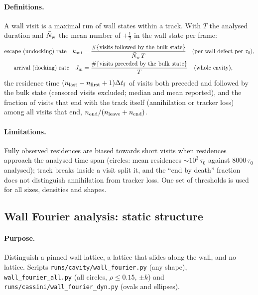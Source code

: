 \paragraph{Definitions.} A wall visit is a maximal run of wall states within a track. With $T$ the analysed duration and
$\bar N_{\rm w}$ the mean number of $+\tfrac12$ in the wall state per frame:
\begin{align}
  \text{escape (undocking) rate}\quad k_{\rm out}&=\frac{\#\{\text{visits followed by the bulk state}\}}{\bar N_{\rm w}\,T}
  \quad\text{(per wall defect per }\tau_0),\\
  \text{arrival (docking) rate}\quad J_{\rm in}&=\frac{\#\{\text{visits preceded by the bulk state}\}}{T}\quad\text{(whole cavity)},
\end{align}
the residence time $(n_{\rm last}-n_{\rm first}+1)\Delta t_{\rm f}$ of visits both preceded and followed by the bulk state (censored visits
excluded; median and mean reported), and the fraction of visits that end with the track itself (annihilation or tracker loss) among all
visits that end, $n_{\rm end}/(n_{\rm leave}+n_{\rm end})$.

\paragraph{Limitations.} Fully observed residences are biased towards short visits when residences approach the analysed time span
(circles: mean residences $\sim10^3\,\tau_0$ against $8000\,\tau_0$ analysed); track breaks inside a visit split it, and the
``end by death'' fraction does not distinguish annihilation from tracker loss. One set of thresholds is used for all sizes, densities and
shapes.

\subsection{Wall Fourier analysis: static structure}
\label{sec:md-fourier-static}

\paragraph{Purpose.} Distinguish a pinned wall lattice, a lattice that slides along the wall, and no lattice. Scripts
\texttt{runs/cavity/wall\_fourier.py} (any shape), \texttt{wall\_fourier\_all.py} (all circles, $\rho\le0.15$, $\pm k$) and
\texttt{runs/cassini/wall\_fourier\_dyn.py} (ovals and ellipses).

